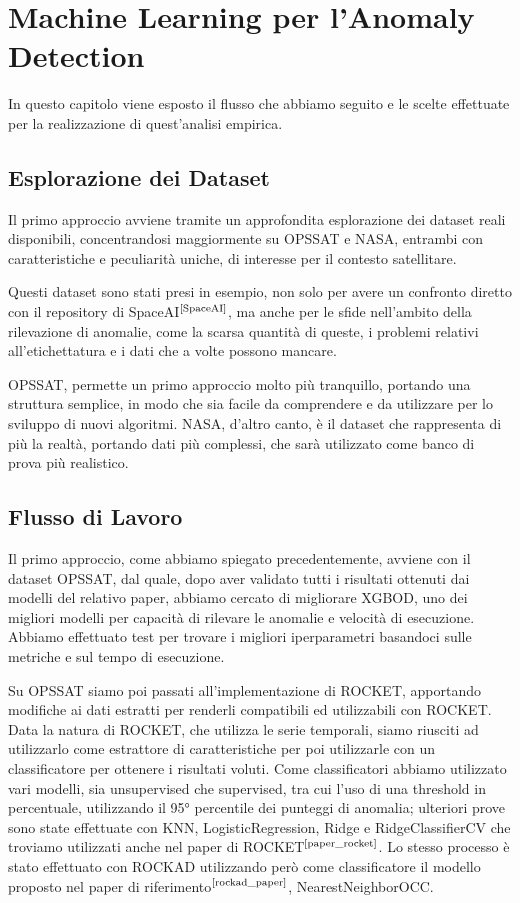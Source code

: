 \chapter{Machine Learning per l'Anomaly Detection}

In questo capitolo viene esposto il flusso che abbiamo seguito e le scelte effettuate per la realizzazione di quest'analisi empirica.

\section{Esplorazione dei Dataset}
Il primo approccio avviene tramite un approfondita esplorazione dei dataset reali disponibili, concentrandosi maggiormente su OPS\textunderscore SAT e NASA, entrambi con caratteristiche e peculiarità uniche, di interesse per il contesto satellitare.

Questi dataset sono stati presi in esempio, non solo per avere un confronto diretto con il repository di SpaceAI$^{\text{\cite{SpaceAI}}}$, ma anche per le sfide nell'ambito della rilevazione di anomalie, come la scarsa quantità di queste, i problemi relativi all'etichettatura e i dati che a volte possono mancare.

OPS\textunderscore SAT, permette un primo approccio molto più tranquillo, portando una struttura semplice, in modo che sia facile da comprendere e da utilizzare per lo sviluppo di nuovi algoritmi.
NASA, d'altro canto, è il dataset che rappresenta di più la realtà, portando dati più complessi, che sarà utilizzato come banco di prova più realistico.


\section{Flusso di Lavoro}
Il primo approccio, come abbiamo spiegato precedentemente, avviene con il dataset OPS\textunderscore SAT, dal quale, dopo aver validato tutti i risultati ottenuti dai modelli del relativo paper, abbiamo cercato di migliorare XGBOD, uno dei migliori modelli per capacità di rilevare le anomalie e velocità di esecuzione. Abbiamo effettuato test per trovare i migliori iperparametri basandoci sulle metriche e sul tempo di esecuzione.

Su OPS\textunderscore SAT siamo poi passati all'implementazione di ROCKET, apportando modifiche ai dati estratti per renderli compatibili ed utilizzabili con ROCKET.
Data la natura di ROCKET, che utilizza le serie temporali, siamo riusciti ad utilizzarlo come estrattore di caratteristiche per poi utilizzarle con un classificatore per ottenere i risultati voluti.
Come classificatori abbiamo utilizzato vari modelli, sia unsupervised che supervised, tra cui l'uso di una threshold in percentuale, utilizzando il 95° percentile dei punteggi di anomalia; ulteriori prove sono state effettuate con KNN, LogisticRegression, Ridge e RidgeClassifierCV che troviamo utilizzati anche nel paper di ROCKET$^{\text{\cite{paper_rocket}}}$.
Lo stesso processo è stato effettuato con ROCKAD utilizzando però come classificatore il modello proposto nel paper di riferimento$^{\text{\cite{rockad_paper}}}$, NearestNeighborOCC.

